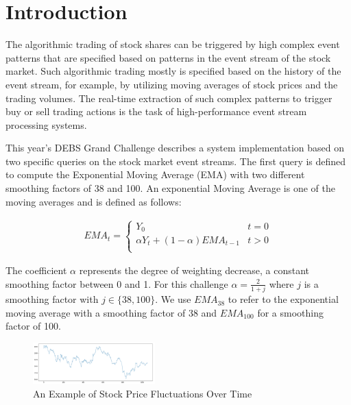 
\section{Introduction}
The algorithmic trading of stock shares can be triggered by high complex event patterns that are specified 
based on patterns in the event stream of the stock market. Such algorithmic trading mostly is specified 
based on the history of the event stream, for example, by utilizing moving averages of stock prices and the trading volumes. 
The real-time extraction of such complex patterns to trigger buy or sell trading actions is the task 
of high-performance event stream processing systems. 

This year's DEBS Grand Challenge \cite{debs2022challenge} describes a system implementation based on two specific queries on the 
stock market event streams. The first query is defined to compute the Exponential Moving Average (EMA) with two 
different smoothing factors of 38 and 100. 
An exponential Moving Average is one of the moving averages and is defined as follows:

\begin{align*}
    EMA_t = \begin{cases} 
        Y_0 &  t = 0 \\ 
        \alpha Y_t + (1-\alpha) EMA_{t-1}& t>0 \\ 
        \end{cases}
\end{align*}

The coefficient $\alpha$ represents the degree of weighting decrease, a constant smoothing factor between 0 and 1.
For this challenge $\alpha = \frac{2}{1+j}$ where $j$ is a smoothing factor with $j \in \{38, 100 \}$.
We use $EMA_{38}$ to refer to the exponential moving average with a smoothing factor of 38 
and $EMA_{100}$ for a smoothing factor of 100. 


\begin{figure}[!ht]
    \begin{center}
        \includegraphics[width=0.42\textwidth]{./images/stock_example.png}
        \caption{An Example of Stock Price Fluctuations Over Time}
        \label{fig:stock}
    \end{center}
\end{figure}



